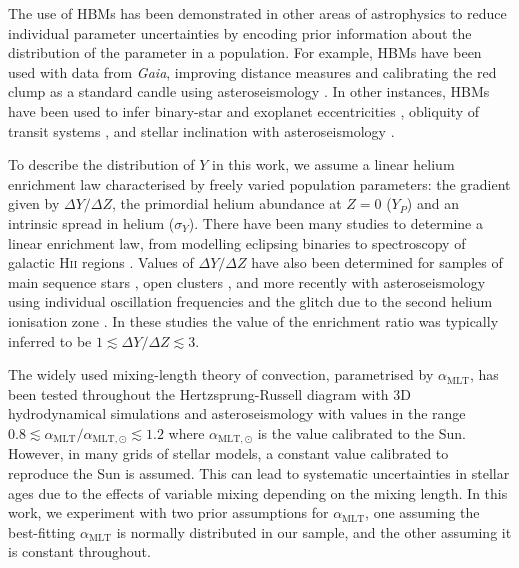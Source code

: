 \documentclass[a4paper,fleqn,usenatbib]{mnras}
\newcommand{\mlt}{\ensuremath{{\alpha_\mathrm{MLT}}}}
\begin{document}
The use of HBMs has been demonstrated in other areas of astrophysics to reduce individual parameter uncertainties by encoding prior information about the distribution of the parameter in a population. For example, HBMs have been used with data from \emph{Gaia}, improving distance measures \citep{Leistedt.Hogg2017, Anderson.Hogg.ea2018} and calibrating the red clump as a standard candle \citep{Hawkins.Leistedt.ea2017, Chan.Bovy2020} using asteroseismology \citep{Hall.Davies.ea2019}. In other instances, HBMs have been used to infer binary-star and exoplanet eccentricities \citep{Hogg.Myers.ea2010}, obliquity of transit systems \citep{Morton.Winn2014}, and stellar inclination with asteroseismology \citep{Campante.Lund.ea2016, Kuszlewicz.Chaplin.ea2019}.

To describe the distribution of $Y$ in this work, we assume a linear helium enrichment law characterised by freely varied population parameters: the gradient given by $\Delta Y / \Delta Z$, the primordial helium abundance at $Z=0$ ($Y_P$) and an intrinsic spread in helium ($\sigma_Y$). There have been many studies to determine a linear enrichment law, from modelling eclipsing binaries \citep{Ribas.Jordi.ea2000} to spectroscopy of galactic H\textsc{ii} regions \citep{Balser2006}. Values of $\Delta Y / \Delta Z$ have also been determined for samples of main sequence stars \citep{Casagrande.Flynn.ea2007}, open clusters \citep{Brogaard.VandenBerg.ea2012}, and more recently with asteroseismology using individual oscillation frequencies \citep{SilvaAguirre.Lund.ea2017} and the glitch due to the second helium ionisation zone \citep{Verma.Raodeo.ea2019}. In these studies the value of the enrichment ratio was typically inferred to be $1 \lesssim \Delta Y / \Delta Z \lesssim 3$.

The widely used mixing-length theory of convection, parametrised by $\mlt$, has been tested throughout the Hertzsprung-Russell diagram with 3D hydrodynamical simulations \citep{Trampedach.Stein.ea2014, Magic.Weiss.ea2015} and asteroseismology \citep{Tayar.Somers.ea2017, Viani.Basu.ea2018, Li.Bedding.ea2018} with values in the range $0.8 \lesssim \mlt/\alpha_{\mathrm{MLT}, \odot} \lesssim 1.2$ where $\alpha_{\mathrm{MLT}, \odot}$ is the value calibrated to the Sun. However, in many grids of stellar models, a constant value calibrated to reproduce the Sun is assumed. This can lead to systematic uncertainties in stellar ages due to the effects of variable mixing depending on the mixing length. In this work, we experiment with two prior assumptions for $\mlt$, one assuming the best-fitting $\mlt$ is normally distributed in our sample, and the other assuming it is constant throughout.
\end{document}
